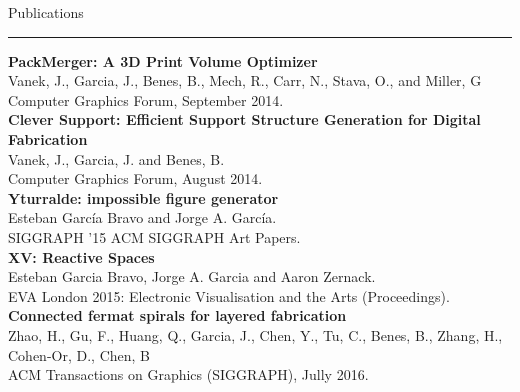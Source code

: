 \documentclass[letterpaper,10pt]{article}
\begin{document}

\begin{minipage}{0.55\textwidth}
\vspace*{0.5cm}
 {\large{Publications}} \\
 \textcolor{Dandelion}{\rule{0.3\textwidth}{0.05in}} 

\textbf{PackMerger: A 3D Print Volume Optimizer} \\
Vanek, J., Garcia, J., Benes, B., Mech, R., Carr, N., Stava, O., and Miller, G\\
Computer Graphics Forum, September 2014.\\

\textbf{Clever Support: Efficient Support Structure Generation for Digital Fabrication} \\
Vanek, J., Garcia, J. and Benes, B.\\
Computer Graphics Forum, August 2014.\\

\textbf{Yturralde: impossible figure generator} \\
Esteban Garc\'{i}a Bravo and Jorge A. Garc\'{i}a.\\
SIGGRAPH '15 ACM SIGGRAPH Art Papers.\\

\textbf{XV: Reactive Spaces} \\
Esteban Garcia Bravo, Jorge A. Garcia and Aaron Zernack.\\
EVA London 2015: Electronic Visualisation and the Arts (Proceedings).\\

\textbf{Connected fermat spirals for layered fabrication} \\
Zhao, H., Gu, F., Huang, Q., Garcia, J., Chen, Y., Tu, C., Benes, B., Zhang, H., Cohen-Or, D., Chen, B\\
ACM Transactions on Graphics (SIGGRAPH), Jully 2016.\\

\end{minipage}
%
\hspace{0.05\textwidth}
%
\end{document}
